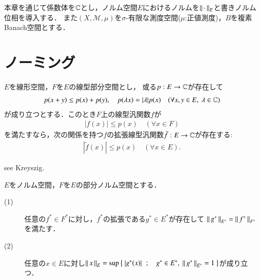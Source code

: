 	本章を通じて係数体を$\mathbb{C}$とし，ノルム空間$E$におけるノルムを$\left\|\, \cdot\, \right\|_{E}$と書きノルム位相を導入する．
	また$(X,\mathcal{M},\mu)$を$\sigma$-有限な測度空間($\mu$:正値測度)，$B$を複素Banach空間とする．

\section{ノーミング}
	\begin{screen}
		\begin{thm}
			$E$を線形空間，$F$を$E$の線型部分空間とし，
			或る$p:E \rightarrow \mathbb{C}$が存在して
			\begin{align}
				p(x + y) \leq p(x) + p(y),
				\quad p(\lambda x) = |\lambda|p(x)
				\quad (\forall x,y \in E,\ \lambda \in \mathbb{C})
				\label{eq:thm_hahn_banach_extension}
			\end{align}
			が成り立つとする．このとき$F$上の線型汎関数$f$が
			\begin{align}
				|f(x)| \leq p(x) \quad (\forall x \in F)
			\end{align}
			を満たすなら，次の関係を持つ$f$の拡張線型汎関数$\tilde{f}:E \rightarrow \mathbb{C}$が存在する:
			\begin{align}
				\left| \tilde{f}(x) \right| \leq p(x) \quad (\forall x \in E).
			\end{align}
			\label{thm:hahn_banach_extension}
		\end{thm}
	\end{screen}
	
	\begin{prf}
		see Kreyszig.
	\end{prf}
	
	\begin{screen}
		\begin{cor}[ノルム空間における拡張定理]
			$E$をノルム空間，$F$を$E$の部分ノルム空間とする．
			\begin{description}
				\item[(1)]
					任意の$f^* \in F^*$に対し，$f^*$の拡張である$g^* \in E^*$が存在して
					$\left\|\, g^*\, \right\|_{E^*} = \left\|\, f^*\, \right\|_{F^*}$を満たす．
				
				\item[(2)]
					任意の$x \in E$に対し$\left\|\, x\, \right\|_{E} = \operatorname*{sup}_{} \left\{\ \left| g^*(x) \right|\ \, ; \quad g^* \in E^*,\ \left\|\, g^*\, \right\|_{E^*} = 1\ \right\}$が成り立つ．
			\end{description}
			\label{cor:hahn_banach_extension}
		\end{cor}
	\end{screen}
	
